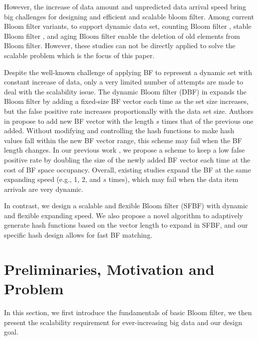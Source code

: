 \documentclass[10pt,journal,letterpaper]{IEEEtran}
\begin{document}
However, the increase of data amount and unpredicted data arrival speed bring big challenges for designing and efficient and scalable bloom filter. Among current Bloom filter variants, to support dynamic data set, counting Bloom filter \cite{fan2000summary}, stable Bloom filter \cite{deng2006approximately}, and aging Bloom filter \cite{yoon2010aging} enable the deletion of old elements from Bloom filter. However, these studies can not be directly applied to solve the scalable problem which is the focus of this paper.


Despite the well-known challenge of applying BF to represent a dynamic set with constant increase of data, only a very limited number of attempts are made to deal with the scalability issue.
 The dynamic Bloom filter (DBF) in \cite{guo2006theory, wei2010mad2} expands the Bloom filter by adding a fixed-size BF vector each time as the set size increases, but the false positive rate increases proportionally with the data set size. Authors in \cite{almeida2007scalable} propose to add new BF vector with the length $s$ times that of the previous one added. Without modifying and controlling the hash functions to make hash values fall within the new BF vector range, this scheme may fail when the BF length changes.
  In our previous work \cite{xie2007scalable}, we propose a scheme to keep a low false positive rate by doubling the size of the newly added BF vector each time at the cost of BF space occupancy.  Overall, existing studies expand the BF at the same expanding speed (e.g., 1, 2, and $s$ times), which may fail when the data item arrivals are very dynamic.

In contrast, we design a scalable and flexible Bloom filter (SFBF) with dynamic and flexible expanding speed. We also propose a novel algorithm to adaptively generate hash functions based on the vector length to expand in SFBF, and our specific hash design allows for fast BF matching.

\section{Preliminaries, Motivation and Problem}
\label{sec:Review of Bloom filter}
In this section, we first introduce the fundamentals of basic Bloom filter, we then present the scalability requirement for ever-increasing big data and our design goal.
\end{document}

